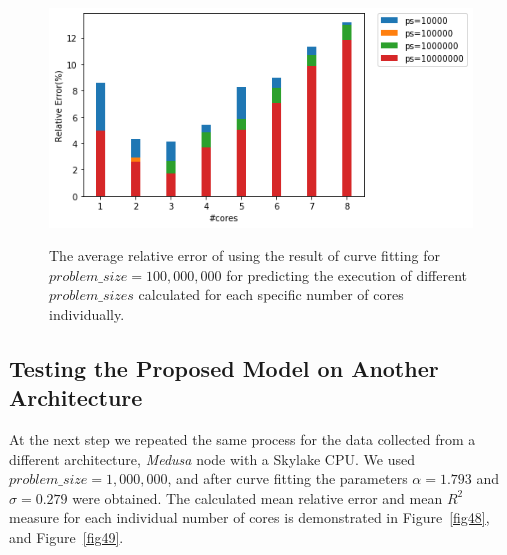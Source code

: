 \begin{figure}[H]
	\centering
	{\includegraphics[scale=.45]{images/hpx_for_loop/fitted/marvin_relative_error_compared.png}}
	\caption{The average relative error of using the result of curve fitting for $problem\_size=100,000,000$ for predicting the execution of different $problem\_{sizes}$ calculated for each specific number of cores individually.}\label{fig59}		
\end{figure}
\subsection{Testing the Proposed Model on Another Architecture}

At the next step we repeated the same process for the data collected from a different architecture, \textit{Medusa} node with a Skylake CPU.
We used $problem\_{size}=1,000,000$, and after curve fitting the parameters $\alpha=1.793$ and $\sigma=0.279$ were obtained. The calculated mean relative error and mean $R^2$ measure for each individual number of cores is demonstrated in Figure~\ref{fig48}, and Figure~\ref{fig49}.

